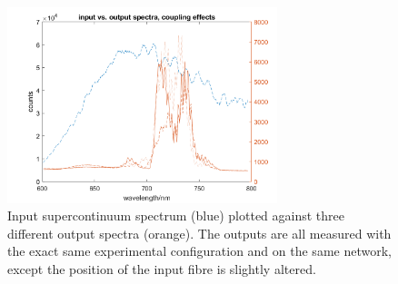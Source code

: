 \begin{figure}[hb]
  \centering
    \includegraphics[width=0.7\textwidth]{ch4/fig4/specdata.png}
    \caption{Input supercontinuum spectrum (blue) plotted against three different output spectra (orange). The outputs are all measured with the exact same experimental configuration and on the same network, except the position of the input fibre is slightly altered.} 
    \label{fig:specdata}
\end{figure}


